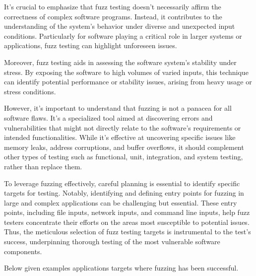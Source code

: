 It's crucial to emphasize that fuzz testing doesn't necessarily affirm the
correctness of complex software programs. Instead, it contributes to the
understanding of the system's behavior under diverse and unexpected input
conditions. Particularly for software playing a critical role in larger
systems or applications, fuzz testing can highlight unforeseen
issues\cite{fuzzinga40:online}\cite{demott2006evolving}\cite{WhatisFu63:online}.

Moreover, fuzz testing aids in assessing the software system's stability under
stress. By exposing the software to high volumes of varied inputs, this
technique can identify potential performance or stability issues, arising
from heavy usage or stress conditions\cite{demott2006evolving}.

However, it's important to understand that fuzzing is not a panacea for
all software flaws. It's a specialized tool aimed at discovering errors
and vulnerabilities that might not directly relate to the software's
requirements or intended functionalities. While it's effective at uncovering
specific issues like memory leaks\cite{shahriar2014testing},
address corruptions\cite{muench2018you}, and buffer overflows\cite{godefroid2020fuzzing},
it should complement other types of testing such as functional, unit,
integration, and system testing, rather than replace
them\cite{pietikainen2016steps}\cite{UnitTest25:online}\cite{WhatisFu63:online}.

To leverage fuzzing effectively, careful planning is essential to identify
specific targets for testing. Notably, identifying and defining entry points
for fuzzing in large and complex applications can be challenging but essential.
These entry points, including file inputs, network inputs, and command
line inputs, help fuzz testers concentrate their efforts on the areas
most susceptible to potential issues\cite{oehlert2005violating}.
Thus, the meticulous selection of
fuzz testing targets is instrumental to the test's success, underpinning
thorough testing of the most vulnerable software components.

Below given examples applications targets where fuzzing has been successful\cite{fuzzingw44:online}.\label{par:target_categories}

